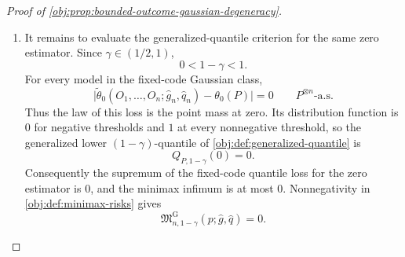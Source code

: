 \documentclass[11pt]{article}
\begin{document}
\begin{proof}[Proof of \cref{obj:prop:bounded-outcome-gaussian-degeneracy}]
\begin{enumerate}
\item It remains to evaluate the generalized-quantile criterion for the same zero estimator. Since \(\gamma\in(1/2,1)\),
\[
0<1-\gamma<1.
\]
For every model in the fixed-code Gaussian class,
\[
\bigl|\widetilde\theta_0(O_1,\ldots,O_n;\widehat g_n,\widehat q_n)-\theta_0(P)\bigr|=0
\qquad P^{\otimes n}\text{-a.s.}
\]
Thus the law of this loss is the point mass at zero. Its distribution function is \(0\) for negative thresholds and \(1\) at every nonnegative threshold, so the generalized lower \((1-\gamma)\)-quantile of \cref{obj:def:generalized-quantile} is
\[
Q_{P,1-\gamma}(0)=0 .
\]
Consequently the supremum of the fixed-code quantile loss for the zero estimator is \(0\), and the minimax infimum is at most \(0\). Nonnegativity in \cref{obj:def:minimax-risks} gives
\[
\mathfrak M_{n,1-\gamma}^{\mathrm G}(p;\widehat g,\widehat q)=0 .
\]
\end{enumerate}
\end{proof}
\end{document}
